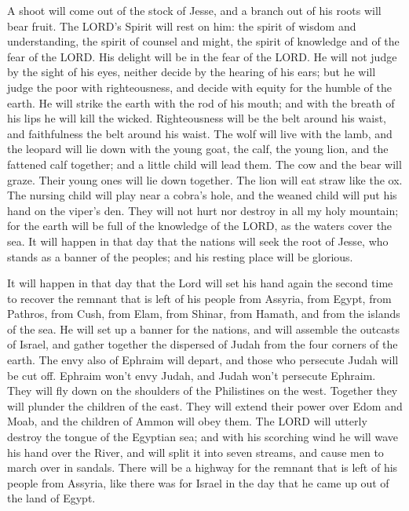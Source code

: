  A shoot will come out of the stock of Jesse, and a branch
out of his roots will bear fruit.  The LORD's Spirit will
rest on him: the spirit of wisdom and understanding, the spirit of
counsel and might, the spirit of knowledge and of the fear of the LORD.
 His delight will be in the fear of the LORD. He will not
judge by the sight of his eyes, neither decide by the hearing of his
ears;  but he will judge the poor with righteousness, and
decide with equity for the humble of the earth. He will strike the earth
with the rod of his mouth; and with the breath of his lips he will kill
the wicked.  Righteousness will be the belt around his
waist, and faithfulness the belt around his waist.  The wolf
will live with the lamb, and the leopard will lie down with the young
goat, the calf, the young lion, and the fattened calf together; and a
little child will lead them.  The cow and the bear will
graze. Their young ones will lie down together. The lion will eat straw
like the ox.  The nursing child will play near a cobra's
hole, and the weaned child will put his hand on the viper's den.
 They will not hurt nor destroy in all my holy mountain; for
the earth will be full of the knowledge of the LORD, as the waters cover
the sea.  It will happen in that day that the nations will
seek the root of Jesse, who stands as a banner of the peoples; and his
resting place will be glorious.

 It will happen in that day that the Lord will set his hand
again the second time to recover the remnant that is left of his people
from Assyria, from Egypt, from Pathros, from Cush, from Elam, from
Shinar, from Hamath, and from the islands of the sea.  He
will set up a banner for the nations, and will assemble the outcasts of
Israel, and gather together the dispersed of Judah from the four corners
of the earth.  The envy also of Ephraim will depart, and
those who persecute Judah will be cut off. Ephraim won't envy Judah, and
Judah won't persecute Ephraim.  They will fly down on the
shoulders of the Philistines on the west. Together they will plunder the
children of the east. They will extend their power over Edom and Moab,
and the children of Ammon will obey them.  The LORD will
utterly destroy the tongue of the Egyptian sea; and with his scorching
wind he will wave his hand over the River, and will split it into seven
streams, and cause men to march over in sandals.  There
will be a highway for the remnant that is left of his people from
Assyria, like there was for Israel in the day that he came up out of the
land of Egypt.

